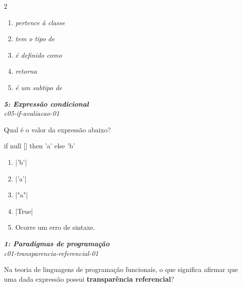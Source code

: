 \documentclass[a4paper,10pt,brazil]{article}
\begin{document}
\begin{multicols}{2}
\begin{enumerate}
  \item \emph{pertence à classe}

  \item \emph{tem o tipo de}

  \item \emph{é definido como}

  \item \emph{retorna}

  \item \emph{é um subtipo de}


\end{enumerate}

\begin{flushright}
  \footnotesize
  \textit{\textbf{5: Expressão condicional}}\\
  \textit{c05-if-avaliacao-01}\\

\end{flushright}
Qual é o valor da expressão abaixo?
\begin{haskellcode}
if null [] then 'a' else 'b'
\end{haskellcode}

\begin{enumerate}
  \item \haskellinline|'b'|

  \item \haskellinline|'a'|

  \item \haskellinline|"a"|

  \item \haskellinline|True|

  \item Ocorre um erro de sintaxe.


\end{enumerate}

\begin{flushright}
  \footnotesize
  \textit{\textbf{1: Paradigmas de programação}}\\
  \textit{c01-transparencia-referencial-01}\\

\end{flushright}
Na teoria de linguagens de programação funcionais, o que significa afirmar que uma dada expressão possui \textbf{transparência referencial}?


\end{multicols}
\end{document}
